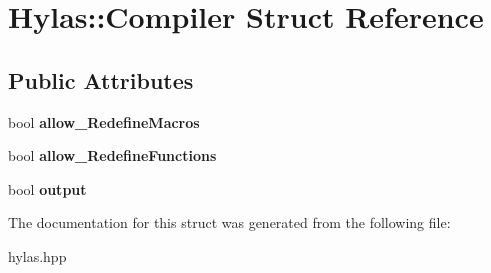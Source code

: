 \hypertarget{structHylas_1_1Compiler}{
\section{Hylas::Compiler Struct Reference}
\label{structHylas_1_1Compiler}
}
\subsection*{Public Attributes}
\begin{DoxyCompactItemize}
\item 
\hypertarget{structHylas_1_1Compiler_aef8902bd1771b058ccf8b89dc4d9f259}{
bool {\bfseries allow\_\-RedefineMacros}}
\label{structHylas_1_1Compiler_aef8902bd1771b058ccf8b89dc4d9f259}

\item 
\hypertarget{structHylas_1_1Compiler_ae256c9e84324dd6f6b595400aeefa7ad}{
bool {\bfseries allow\_\-RedefineFunctions}}
\label{structHylas_1_1Compiler_ae256c9e84324dd6f6b595400aeefa7ad}

\item 
\hypertarget{structHylas_1_1Compiler_ac5a42b0126cdcf422c70db422d4c2bc9}{
bool {\bfseries output}}
\label{structHylas_1_1Compiler_ac5a42b0126cdcf422c70db422d4c2bc9}

\end{DoxyCompactItemize}


The documentation for this struct was generated from the following file:\begin{DoxyCompactItemize}
\item 
hylas.hpp\end{DoxyCompactItemize}
